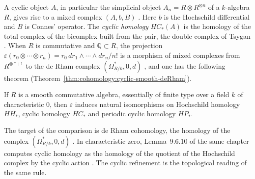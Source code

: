 A cyclic object $A$, in particular the simplicial object
$A_n=R\otimes R^{\otimes n}$ of a $k$-algebra $R$, gives rise to a mixed
complex $(A,b,B)$ \cite[\S9.8, p.~345]{Weibel1994}. Here $b$ is the
Hochschild differential and $B$ is Connes' operator. The \emph{cyclic
homology} $HC_*(A)$ is the homology of the total complex of the bicomplex
built from the pair, the double complex of Tsygan
\cite[Definition~9.6.7, p.~334]{Weibel1994}. When $R$ is commutative and
$\mathbb{Q}\subset R$, the projection $\varepsilon(r_0\otimes\cdots\otimes
r_n)=r_0\,dr_1\wedge\cdots\wedge dr_n/n!$ is a morphism of mixed complexes
from $R^{\otimes\ast+1}$ to the de Rham complex $(\Omega^*_{R/k},0,d)$
\cite[9.8.12, p.~351]{Weibel1994}, and one has the following theorem (Theorem~\ref{thm:cohomology:cyclic-smooth-deRham}).

\begin{theorem}\label{thm:cohomology:cyclic-smooth-deRham}
If $R$ is a smooth commutative algebra, essentially of finite type over a
field $k$ of characteristic $0$, then $\varepsilon$ induces natural
isomorphisms on Hochschild homology $HH_*$, cyclic homology $HC_*$ and
periodic cyclic homology $HP_*$.
\end{theorem}

The target of the comparison is de Rham cohomology, the homology of the
complex $(\Omega^*_{R/k},0,d)$ \cite[9.8.9, p.~350]{Weibel1994}. In
characteristic zero, Lemma~9.6.10 of the same chapter computes cyclic
homology as the homology of the quotient of the Hochschild complex by the
cyclic action \cite[Lemma~9.6.10, p.~335]{Weibel1994}. The cyclic
refinement is the topological reading of the same rule. %

